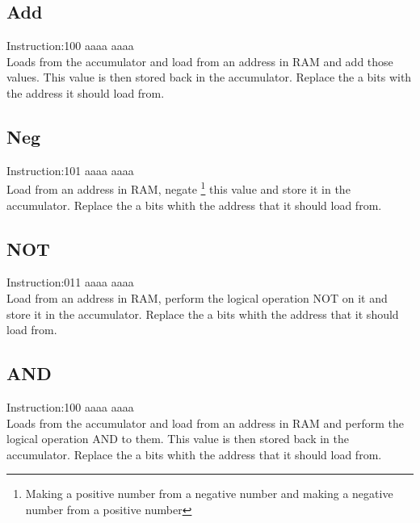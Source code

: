 \documentclass{article}
\begin{document}
\subsection{Add}
Instruction:100 aaaa aaaa
~\\
Loads from the accumulator and load from an address in RAM and add those values. This value is then stored back in the accumulator. Replace the a bits with the address it should load from.
\subsection{Neg}
Instruction:101 aaaa aaaa
~\\
Load from an address in RAM, negate \footnote{Making a positive number from a negative number and making a negative number from a positive number} this value and store it in the accumulator. Replace the a bits whith the address that it should load from.
\subsection{NOT}
Instruction:011 aaaa aaaa
~\\
Load from an address in RAM, perform the logical operation NOT on it and store it in the accumulator. Replace the a bits whith the address that it should load from.
\subsection{AND}
Instruction:100 aaaa aaaa
~\\
Loads from the accumulator and load from an address in RAM and perform the logical operation AND to them. This value is then stored back in the accumulator. Replace the a bits whith the address that it should load from.
\end{document}
